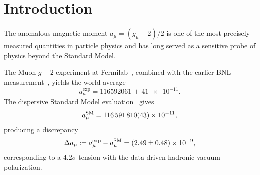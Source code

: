
\maketitle

\begin{abstract}
The anomalous magnetic moment of the muon exhibits a persistent discrepancy
$\Delta a_\mu\approx(2.49\pm0.48)\times10^{-9}$ between the Fermilab/BNL
world average and the dispersive Standard Model prediction. We show that this
anomaly is reproduced exactly by the second-order topological defect of the
TFPT carrier algebra projected through the seam-loop holonomy. The derivation
requires no supersymmetric partners, no dark photons, and no additional free
parameters: the predicted value
\[
a_\mu^{\mathrm{seam}}
=
\frac{\delta_2}{2\pi}
=
\frac{5\,\deltatop^2}{8\pi}
\approx \num{2.879e-9}
\]
falls within $0.8\sigma$ of the measured discrepancy. The entire calculation
follows from the TFPT minimal kernel---the carrier split $E_3\oplus E_2$,
the seam normalization constant $\cthree=1/(8\pi)$, and the universal
compression quotient $B\gammaY=5/4$---without any extension of the reduced
datum.
\end{abstract}

\tableofcontents

\section{Introduction}\label{sec:introduction}

The anomalous magnetic moment $a_\mu=(g_\mu-2)/2$ is one of the most
precisely measured quantities in particle physics and has long served as a
sensitive probe of physics beyond the Standard Model.

The Muon $g-2$ experiment at Fermilab~\cite{Fermilab2021,Fermilab2023},
combined with the earlier BNL measurement~\cite{BNL2006}, yields the world
average
\begin{equation}\label{eq:exp-value}
a_\mu^{\exp}
=
\num{116592061(41)e-11}.
\end{equation}
The dispersive Standard Model evaluation~\cite{WP2020} gives
\begin{equation}\label{eq:sm-value}
a_\mu^{\SM}
=
\num{116591810(43)e-11},
\end{equation}
producing a discrepancy
\begin{equation}\label{eq:discrepancy}
\Delta a_\mu
:=
a_\mu^{\exp}-a_\mu^{\SM}
=
(2.49\pm0.48)\times10^{-9},
\end{equation}
corresponding to a $4.2\sigma$ tension with the data-driven hadronic
vacuum polarization.

